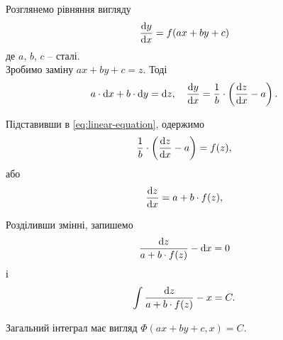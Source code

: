 Розглянемо рівняння вигляду
\begin{equation*}
	\label{eq:linear-equation}
	\frac{\mathop{}\!\mathrm{d} y}{\mathop{}\!\mathrm{d} x} = f(a x + b y + c)
\end{equation*}
де $a$, $b$, $c$ -- сталі. \\

Зробимо заміну $a x + b y + c = z$. Тоді 
\begin{equation*}
	a \cdot \mathop{}\!\mathrm{d} x + b \cdot \mathop{}\!\mathrm{d} y = \mathop{}\!\mathrm{d} z, \quad \frac{\mathop{}\!\mathrm{d} y}{\mathop{}\!\mathrm{d} x} = \frac1b \cdot \left( \frac{\mathop{}\!\mathrm{d} z}{\mathop{}\!\mathrm{d} x} - a \right).
\end{equation*}

Підставивши в \eqref{eq:linear-equation}, одержимо
\begin{equation*}
	\frac1b \cdot \left( \frac{\mathop{}\!\mathrm{d} z}{\mathop{}\!\mathrm{d} x} - a \right) = f(z),
\end{equation*}
або
\begin{equation*}
	\frac{\mathop{}\!\mathrm{d} z}{\mathop{}\!\mathrm{d} x} = a + b \cdot f (z),
\end{equation*}

Розділивши змінні, запишемо
\begin{equation*}
	\frac{\mathop{}\!\mathrm{d} z}{a + b \cdot f (z)} - \mathop{}\!\mathrm{d} x = 0
\end{equation*}
і
\begin{equation*}
	\int \frac{\mathop{}\!\mathrm{d} z}{a + b \cdot f (z)} - x = C.
\end{equation*}

Загальний інтеграл має вигляд $\Phi(a x + b y + c, x) = C$.